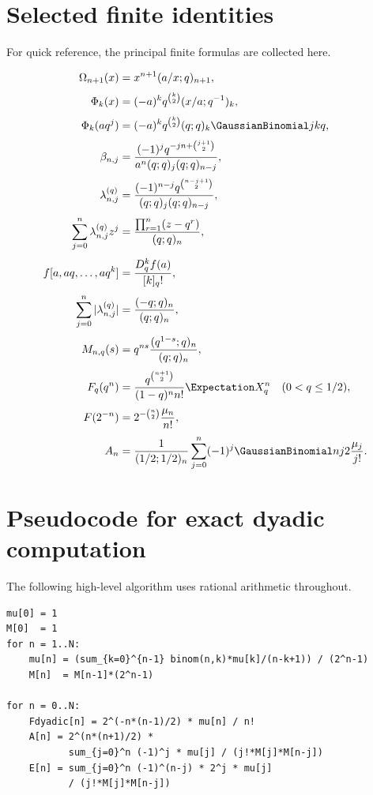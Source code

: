 \section{Selected finite identities}
\label{g2:app:finite-identities}

For quick reference, the principal finite formulas are collected here.

\begin{align*}
 \Omega_{n+1}(x)
 &=x^{n+1}(a/x;q)_{n+1},\\[0.3em]
 \Phi_k(x)
 &=(-a)^kq^{\binom k2}(x/a;q^{-1})_k,\\[0.3em]
 \Phi_k(aq^j)
 &=(-a)^kq^{\binom k2}(q;q)_k\GaussianBinomial jkq,\\[0.3em]
 \beta_{n,j}
 &=\frac{(-1)^jq^{-jn+\binom{j+1}{2}}}
 {a^n(q;q)_j(q;q)_{n-j}},\\[0.3em]
 \lambda_{n,j}^{(q)}
 &=\frac{(-1)^{n-j}q^{\binom{n-j+1}{2}}}
 {(q;q)_j(q;q)_{n-j}},\\[0.3em]
 \sum_{j=0}^n\lambda_{n,j}^{(q)}z^j
 &=\frac{\prod_{r=1}^n(z-q^r)}{(q;q)_n},\\[0.3em]
 f[a,aq,\ldots,aq^k]
 &=\frac{D_q^kf(a)}{[k]_q!},\\[0.3em]
 \sum_{j=0}^n|\lambda_{n,j}^{(q)}|
 &=\frac{(-q;q)_n}{(q;q)_n},\\[0.3em]
 M_{n,q}(s)
 &=q^{ns}\frac{(q^{1-s};q)_n}{(q;q)_n},\\[0.3em]
 F_q(q^n)
 &=\frac{q^{\binom{n+1}{2}}}{(1-q)^nn!}\Expectation X_q^n
 \quad(0<q\le1/2),\\[0.3em]
 F(2^{-n})
 &=2^{-\binom n2}\frac{\mu_n}{n!},\\[0.3em]
 A_n
 &=\frac1{(1/2;1/2)_n}
 \sum_{j=0}^n(-1)^j\GaussianBinomial nj2\frac{\mu_j}{j!}.
\end{align*}

\section{Pseudocode for exact dyadic computation}
\label{g2:app:pseudocode}

The following high-level algorithm uses rational arithmetic throughout.

\begin{lstlisting}[style=pythonstyle]
mu[0] = 1
M[0]  = 1
for n = 1..N:
    mu[n] = (sum_{k=0}^{n-1} binom(n,k)*mu[k]/(n-k+1)) / (2^n-1)
    M[n]  = M[n-1]*(2^n-1)

for n = 0..N:
    Fdyadic[n] = 2^(-n*(n-1)/2) * mu[n] / n!
    A[n] = 2^(n*(n+1)/2) *
           sum_{j=0}^n (-1)^j * mu[j] / (j!*M[j]*M[n-j])
    E[n] = sum_{j=0}^n (-1)^(n-j) * 2^j * mu[j]
           / (j!*M[j]*M[n-j])
\end{lstlisting}

